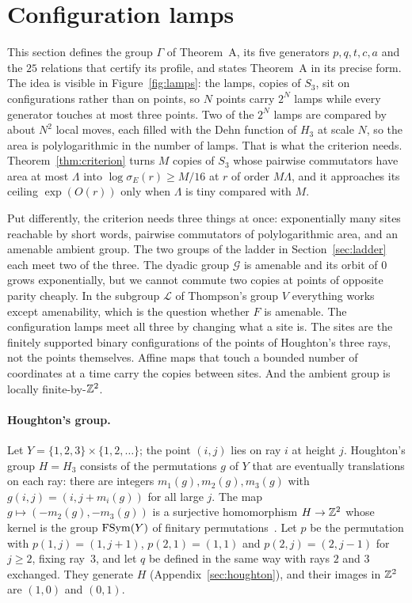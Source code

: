 \section{Configuration lamps}\label{sec:group}
\enlargethispage{2pt}

This section defines the group $\Gamma$ of Theorem~A, its five generators $p,q,t,c,a$ and the $25$ relations that certify its profile, and
states Theorem~A in its precise form. The idea is visible in Figure~\ref{fig:lamps}: the lamps, copies of $S_3$, sit on configurations rather than on
points, so $N$ points carry $2^N$ lamps while every generator touches at most three points. Two of the $2^N$ lamps are compared by about $N^2$ local moves,
each filled with the Dehn function of $H_3$ at scale $N$, so the area is polylogarithmic in the number of lamps. That is what the criterion
needs. Theorem~\ref{thm:criterion} turns $M$ copies of $S_3$ whose pairwise commutators have area at most $\Lambda$ into
$\log\sigma_E(r)\ge M/16$ at $r$ of order $M\Lambda$, and it approaches its ceiling $\exp(O(r))$ only when $\Lambda$ is tiny compared with $M$.

\label{sec:toward}Put differently, the criterion needs three things at once: exponentially many sites reachable by short words, pairwise
commutators of polylogarithmic area, and an amenable ambient group. The two groups of the ladder in Section~\ref{sec:ladder} each meet two of
the three. The dyadic group $\mathcal G$ is amenable and its orbit of $0$ grows exponentially, but we cannot commute two copies at points of
opposite parity cheaply. In the subgroup $\mathcal L$ of Thompson's group $V$ everything works except amenability, which is the question
whether $F$ is amenable. The configuration lamps meet all three by changing what a site is. The sites are the finitely supported binary
configurations of the points of Houghton's three rays, not the points themselves. Affine maps that touch a bounded number of coordinates at a
time carry the copies between sites. And the ambient group is locally finite-by-$\mathbb Z^2$.

\paragraph{Houghton's group.} Let $Y=\{1,2,3\}\times\{1,2,\dots\}$; the point $(i,j)$ lies on ray $i$ at height $j$. Houghton's group
$H=H_3$ consists of the permutations $g$ of $Y$ that are eventually translations on each ray: there are integers $m_1(g),m_2(g),m_3(g)$ with
$g(i,j)=(i,j+m_i(g))$ for all large $j$. The map $g\mapsto(-m_2(g),-m_3(g))$ is a surjective homomorphism $H\to\mathbb Z^2$ whose kernel is the group
$\operatorname{FSym}(Y)$ of finitary permutations~\cite{Houghton1978}. Let $p$ be the permutation with $p(1,j)=(1,j+1)$, $p(2,1)=(1,1)$ and
$p(2,j)=(2,j-1)$ for $j\ge2$, fixing ray~$3$, and let $q$ be defined in the same way with rays $2$ and $3$ exchanged. They generate $H$
(Appendix~\ref{sec:houghton}), and their images in $\mathbb Z^2$ are $(1,0)$ and $(0,1)$.

